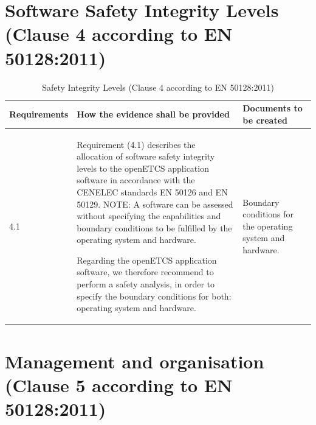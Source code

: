 \documentclass{template/openetcs_report}
\begin{document}
\section{Software Safety Integrity Levels (Clause 4 according to EN 50128:2011)}
\label{clause42}
{\footnotesize\sffamily\centering
\begin{longtable}{|p{2cm}|p{9cm}|p{3cm}|}
\caption{Safety Integrity Levels (Clause 4 according to EN 50128:2011)}\\
\hline
\bfseries Requirements & \bfseries How the evidence shall be provided & \bfseries Documents to be created\\
\hline
\hline
\endhead
\hline
\endfoot

4.1 & Requirement (4.1) describes the allocation of software safety integrity levels to the openETCS application software in accordance with the CENELEC standards EN 50126 and EN 50129.
\linebreak
\linebreak
NOTE:\linebreak 
A software can be assessed without specifying the capabilities and boundary conditions to be fulfilled by the operating system and hardware. 

Regarding the openETCS application software, we therefore recommend to perform a safety analysis, in order to specify the boundary conditions for both: operating system and hardware.
& Boundary conditions for the operating system and hardware.\\ 
\hline
\end{longtable}}


\section{Management and organisation (Clause 5 according to EN 50128:2011)}
\label{clause52}
\end{document}
